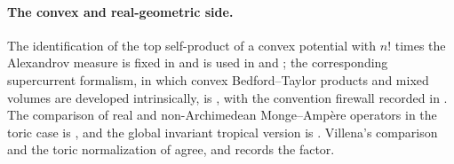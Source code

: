 \paragraph{The convex and real-geometric side.}
The identification of the top self-product of a convex potential with $n!$
times the Alexandrov measure is fixed in
 and is used in
 and ; the corresponding
supercurrent formalism, in which convex Bedford--Taylor products and mixed
volumes are developed intrinsically, is \cite{Ber26Convex}, with the
convention firewall recorded in .  The comparison of
real and non-Archimedean Monge--Amp\`ere operators in the toric case is
\cite{Vil20}, and the global invariant tropical version is
\cite{BGJKK25}.  Villena's comparison and the toric normalization of
 agree, and
 records the factor.

